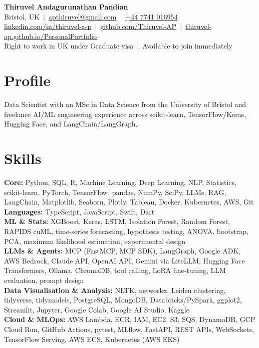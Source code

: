 \documentclass[a4paper,11pt]{article}
\begin{document}
\fontsize{11}{13.2}\selectfont

\begin{center}
  {\LARGE\bfseries Thiruvel Andagurunathan Pandian}\\[3pt]
  Bristol, UK \,$|$\, \href{mailto:apthiruvel@gmail.com}{apthiruvel@gmail.com} \,$|$\, \href{tel:+447741016954}{+44 7741 016954}\\[1pt]
\href{https://www.linkedin.com/in/thiruvel-a-p/}{linkedin.com/in/thiruvel-a-p} \,$|$\, \href{https://github.com/Thiruvel-AP}{github.com/Thiruvel-AP} \,$|$\, \href{https://thiruvel-ap.github.io/PersonalPortfolio/}{thiruvel-ap.github.io/PersonalPortfolio}\\[1pt]
  Right to work in UK under Graduate visa \,$|$\, Available to join immediately
\end{center}

\section{Profile}
Data Scientist with an MSc in Data Science from the University of Bristol and freelance AI/ML engineering experience across scikit-learn, TensorFlow/Keras, Hugging Face, and LangChain/LangGraph.

\section{Skills}
\textbf{Core:} Python, SQL, R, Machine Learning, Deep Learning, NLP, Statistics, scikit-learn, PyTorch, TensorFlow, pandas, NumPy, SciPy, LLMs, RAG, LangChain, Matplotlib, Seaborn, Plotly, Tableau, Docker, Kubernetes, AWS, Git\\[2pt]
\textbf{Languages:} TypeScript, JavaScript, Swift, Dart\\[2pt]
\textbf{ML \& Stats:} XGBoost, Keras, LSTM, Isolation Forest, Random Forest, RAPIDS cuML, time-series forecasting, hypothesis testing, ANOVA, bootstrap, PCA, maximum likelihood estimation, experimental design\\[2pt]
\textbf{LLMs \& Agents:} MCP (FastMCP, MCP SDK), LangGraph, Google ADK, AWS Bedrock, Claude API, OpenAI API, Gemini via LiteLLM, Hugging Face Transformers, Ollama, ChromaDB, tool calling, LoRA fine-tuning, LLM evaluation, prompt design\\[2pt]
\textbf{Data Visualisation \& Analysis:} NLTK, networkx, Leiden clustering, tidyverse, tidymodels, PostgreSQL, MongoDB, Databricks/PySpark, ggplot2, Streamlit, Jupyter, Google Colab, Google AI Studio, Kaggle\\[2pt]
\textbf{Cloud \& MLOps:} AWS Lambda, ECR, IAM, EC2, S3, SQS, DynamoDB, GCP Cloud Run, GitHub Actions, pytest, MLflow, FastAPI, REST APIs, WebSockets, TensorFlow Serving, AWS ECS, Kubernetes (AWS EKS)
\end{document}
